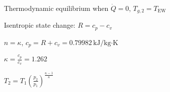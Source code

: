 Thermodynamic equilibrium when \( \dot{Q} = 0 \), \( T_{g,2} = T_{\text{EW}} \)  

Isentropic state change: \( R = c_p - c_v \)  

\( n = \kappa \), \( c_p = R + c_v = 0.79982 \, \text{kJ}/\text{kg·K} \)  

\( \kappa = \frac{c_p}{c_v} = 1.262 \)  

\( T_2 = T_1 \left( \frac{p_2}{p_1} \right)^{\frac{\kappa - 1}{\kappa}} \)